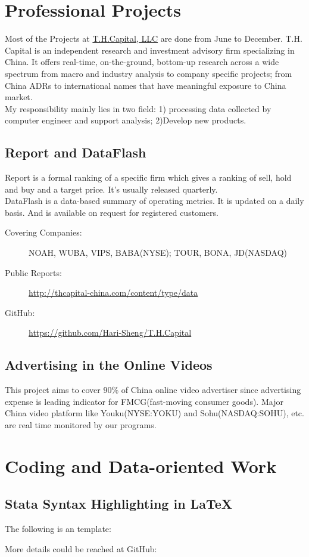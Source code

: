 \documentclass{article}
\begin{document}
\newpage
\section{Professional Projects}
Most of the Projects at \href{http://thcapital-china.com/}{T.H.Capital, LLC} are done from June to December. T.H. Capital is an independent research and investment advisory firm specializing in China. It offers real-time, on-the-ground, bottom-up research across a wide spectrum from macro and industry analysis to company specific projects; from China ADRs to international names that have meaningful exposure to China market. \\
My responsibility mainly lies in two field: 1) processing data collected by computer engineer and support analysis; 2)Develop new products.


\subsection{Report and DataFlash}
Report is a formal ranking of a specific firm which gives a ranking of sell, hold and buy and a target price. It's usually released quarterly.\\
DataFlash is a data-based summary of operating metrics. It is updated on a daily basis. And is available on request for registered customers.
\begin{description}
\item [Covering Companies:] NOAH, WUBA, VIPS, BABA(NYSE); TOUR, BONA, JD(NASDAQ) 
\item [Public Reports:] \url{http://thcapital-china.com/content/type/data}
\item [GitHub:] \url{https://github.com/Hari-Sheng/T.H.Capital}
\end{description}
\subsection{Advertising in the Online Videos}
This project aims to cover 90\% of China online video advertiser since advertising expense is leading indicator for FMCG(fast-moving consumer goods). Major China video platform like Youku(NYSE:YOKU) and Sohu(NASDAQ:SOHU), etc. are real time monitored by our programs. 

\newpage
\section{Coding and Data-oriented Work}
\subsection{Stata Syntax Highlighting in \LaTeX}	
The following is an template:

More details could be reached at GitHub:
\end{document}
